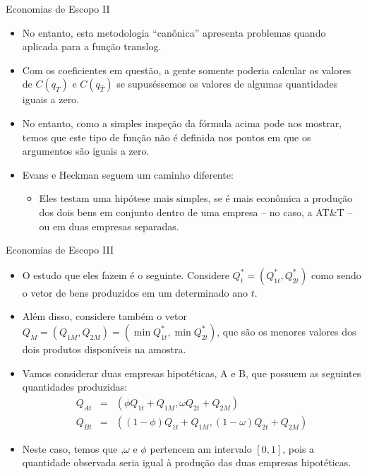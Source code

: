 \documentclass{beamer}
\begin{document}
\begin{frame}{Economias de Escopo II}

\begin{itemize}
\item No entanto, esta metodologia ``canônica'' apresenta problemas quando
aplicada para a função translog.
\item Com os coeficientes em questão, a gente somente poderia calcular os
valores de $C(q_{T})$ e $C(q_{\hat{T}})$ se supuséssemos os valores
de algumas quantidades iguais a zero. 
\item No entanto, como a simples inspeção da fórmula acima pode nos mostrar,
temos que este tipo de função não é definida nos pontos em que os
argumentos são iguais a zero. 
\item Evans e Heckman seguem um caminho diferente:

\begin{itemize}
\item Eles testam uma hipótese mais simples, se é mais econômica a produção
dos dois bens em conjunto dentro de uma empresa -- no caso,
a AT\&T -- ou em duas empresas separadas. 
\end{itemize}
\end{itemize}
\end{frame}

\begin{frame}{Economias de Escopo III}

\begin{itemize}
\item O estudo que eles fazem é o seguinte. Considere $Q_{t}^{*}=(Q_{1t}^{*},Q_{2t}^{*})$
como sendo o vetor de bens produzidos em um determinado ano $t$. 
\item Além disso, considere também o vetor $Q_{M}=(Q_{1M},Q_{2M})=(\min Q_{1t}^{*},\min Q_{2t}^{*})$,
que são os menores valores dos dois produtos disponíveis na amostra. 
\item Vamos considerar duas empresas hipotéticas, A e B, que possuem as
seguintes quantidades produzidas:
\begin{eqnarray*}
Q_{At} & = & (\phi Q_{1t}+Q_{1M},\omega Q_{2t}+Q_{2M})\\
Q_{Bt} & = & ((1-\phi)Q_{1t}+Q_{1M},(1-\omega)Q_{2t}+Q_{2M})
\end{eqnarray*}
\item Neste caso, temos que ,$\omega$ e $\phi$ pertencem am intervalo
$[0,1]$, pois a quantidade observada seria igual à produção das duas
empresas hipotéticas. 
\end{itemize}
\end{frame}
\end{document}
